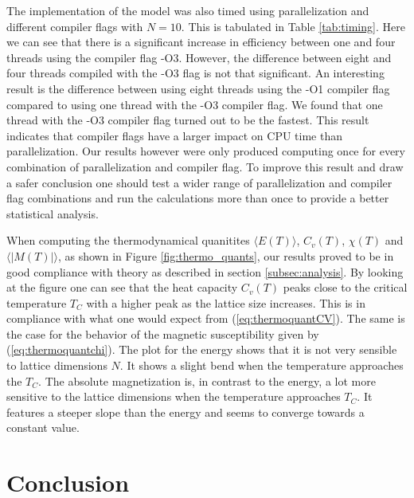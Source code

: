 \documentclass[twocolumn]{aastex62}
\begin{document}
The implementation of the model was also timed using parallelization and
different compiler flags with $N=10$. This is tabulated in Table \ref{tab:timing}. Here we
can see that there is a significant increase in efficiency between one and four
threads using the compiler flag -O3. However, the difference between eight and four
threads compiled with the -O3 flag is not that significant. An interesting
result is the difference between using eight threads using the -O1 compiler flag
compared to using one thread with the -O3 compiler flag. We found that one
thread with the -O3 compiler flag turned out to be the fastest. This result
indicates that compiler flags have a larger impact on CPU time than
parallelization. Our results however were only produced computing once for every
combination of parallelization and compiler flag. To improve this result and
draw a safer conclusion one should test a wider range of parallelization and
compiler flag combinations and run the calculations more than once to provide a
better statistical analysis.\\\indent

When computing the thermodynamical quanitites $\langle E(T) \rangle$,  $C_v(T)$,
$\chi(T)$ and $\langle \vert M(T) \vert \rangle$, as shown in Figure
\ref{fig:thermo_quants}, our results proved to be in good compliance with theory
as described in section \ref{subsec:analysis}. By looking at the figure one can
see that the heat capacity $C_v(T)$ peaks close to the critical temperature
$T_C$ with a higher peak as the lattice size increases. This is in compliance
with what one would expect from (\ref{eq:thermoquantCV}). The same is the case
for the behavior of the magnetic susceptibility given by
(\ref{eq:thermoquantchi}). The plot for the energy shows that it is not very sensible
to lattice dimensions $N$. It shows a slight bend when the temperature
approaches the $T_C$. The absolute magnetization is, in contrast to the energy,
a lot more sensitive to the lattice dimensions when the temperature approaches
$T_C$. It features a steeper slope than the energy and seems to converge towards
a constant value. 




\section{Conclusion} \label{sec:conclusion}




\end{document}
